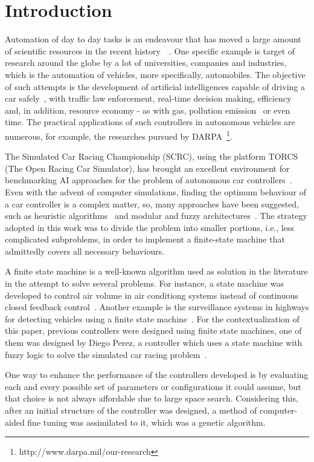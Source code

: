 \section{\textbf{Introduction}} \label{sec:Intro}
	
	Automation of day to day tasks is an endeavour that has moved a large amount of scientific resources in the recent history~\cite{INDUS}~\cite{APPLI}. One specific example is target of research around the globe by a lot of universities, companies	and industries, which is the automation of vehicles, more specifically, automobiles. The objective of such attempts is the development of artificial intelligences capable of driving a car safely~\cite{SAFE}, with traffic law enforcement, real-time decision making, efficiency and, in addition, resource economy - as with gas, pollution emission~\cite{AUTOM} or even time. The practical applications of such controllers in autonomous vehicles are numerous, for example, the researches pursued by DARPA~\footnote{http://www.darpa.mil/our-research}.

	The Simulated Car Racing Championship (SCRC), using the platform TORCS (The Open Racing Car Simulator), has	brought an excellent environment for benchmarking AI approaches for the problem of autonomous car controllers~\cite{2009}. Even with the advent of computer simulations, finding the optimum behaviour of a car controller is a complex matter, so, many approaches have been suggested, such as heuristic algorithms~\cite{MrRacer} and modular and fuzzy architectures~\cite{AUTOPIA}. The strategy adopted in this work was to divide the problem into smaller portions, i.e., less complicated subproblems, in order to implement a finite-state machine that admittedly covers all necessary behaviours.

    A finite state machine is a well-known algorithm used as solution in the literature in the attempt to solve several problems. For instance, a state machine was developed to control air volume in air conditiong systems instead of continuous closed feedback control~\cite{BERNARD}. Another example is the surveillance systems in highways for detecting vehicles using a finite state machine~\cite{DOHYUN}. For the contextualization of this paper, previous controllers were designed using finite state machines, one of them was designed by Diego Perez, a controller which uses a state machine with fuzzy logic to solve the simulated car racing problem~\cite{DIEGO}.
	
	One way to enhance the performance of the controllers developed is by evaluating each and every possible set of parameters or configurations it could assume, but that choice is not always affordable due to large space search. Considering this, after an initial structure of the controller was designed, a method of computer-aided fine tuning was assimilated to it, which was a genetic algorithm.
	
